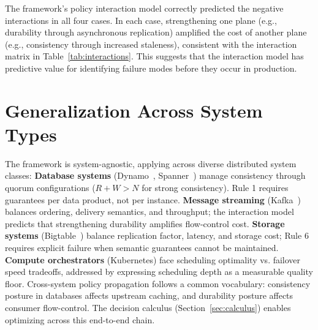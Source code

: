 \documentclass[conference]{IEEEtran}
\begin{document}
{\begin{table}[t]
\caption{Rule Violations Across Case Studies}
\label{tab:case-studies}
\centering
{}
\end{table}

The framework's policy interaction model correctly predicted the negative interactions in all four cases. In each case, strengthening one plane (e.g., durability through asynchronous replication) amplified the cost of another plane (e.g., consistency through increased staleness), consistent with the interaction matrix in Table~\ref{tab:interactions}. This suggests that the interaction model has predictive value for identifying failure modes before they occur in production.

\section{Generalization Across System Types}

The framework is system-agnostic, applying across diverse distributed system classes:
\textbf{Database systems} (Dynamo~\cite{dynamo}, Spanner~\cite{spanner}) manage consistency through quorum configurations ($R+W > N$ for strong consistency). Rule 1 requires guarantees per data product, not per instance.
\textbf{Message streaming} (Kafka~\cite{kafka}) balances ordering, delivery semantics, and throughput; the interaction model predicts that strengthening durability amplifies flow-control cost.
\textbf{Storage systems} (Bigtable~\cite{bigtable}) balance replication factor, latency, and storage cost; Rule 6 requires explicit failure when semantic guarantees cannot be maintained.
\textbf{Compute orchestrators} (Kubernetes) face scheduling optimality vs. failover speed tradeoffs, addressed by expressing scheduling depth as a measurable quality floor.
Cross-system policy propagation follows a common vocabulary: consistency posture in databases affects upstream caching, and durability posture affects consumer flow-control. The decision calculus (Section~\ref{sec:calculus}) enables optimizing across this end-to-end chain.

}
\end{document}
